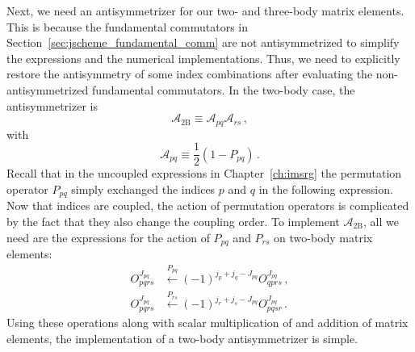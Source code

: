 Next, we need an antisymmetrizer for our two- and three-body matrix elements.
This is because the fundamental commutators in Section~\ref{sec:jscheme_fundamental_comm}
are not antisymmetrized to simplify the expressions and the numerical implementations.
Thus, we need to explicitly restore the antisymmetry of some index combinations
after evaluating the non-antisymmetrized fundamental commutators.
In the two-body case,
the antisymmetrizer is
\begin{equation}\label{eq:twobody_antisymmetrizer}
  \mathcal{A}_{\text{2B}} \equiv\mathcal{A}_{pq} \mathcal{A}_{rs}\,,
\end{equation}
with
\begin{equation}
  \mathcal{A}_{pq} \equiv \frac{1}{2}(1 - P_{pq})\,.
\end{equation}
Recall that in the uncoupled expressions in Chapter~\ref{ch:imsrg}
the permutation operator $P_{pq}$ simply exchanged the indices $p$ and $q$ in the following expression.
Now that indices are coupled,
the action of permutation operators is complicated
by the fact that they also change the coupling order.
To implement $\mathcal{A}_{\text{2B}}$,
all we need are the expressions for the action of $P_{pq}$
and $P_{rs}$ on two-body matrix elements:
\begin{subequations}
  \begin{align}
    O_{pqrs}^{J_{pq}} & \xleftarrow{P_{pq}} (-1)^{j_p + j_q - J_{pq}} O_{qprs}^{J_{pq}}\,, \\
    O_{pqrs}^{J_{pq}} & \xleftarrow{P_{rs}} (-1)^{j_r + j_s - J_{pq}} O_{pqsr}^{J_{pq}}\,.
  \end{align}
\end{subequations}
Using these operations along with scalar multiplication of and addition of matrix elements,
the implementation of a two-body antisymmetrizer is simple.

